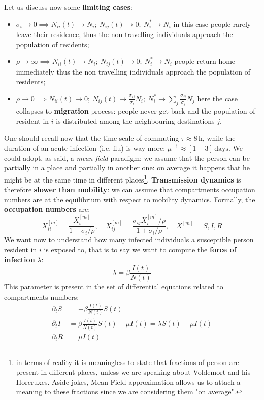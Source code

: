 \documentclass[../main/main.tex]{subfiles}
\begin{document}
Let us discuss now some \textbf{limiting cases}:
\begin{itemize}
    \item $\sigma_i \to 0 \implies N_{ii}(t) \to N_i;\ N_{ij}(t) \to 0;\ N_i^*\to N_i$ in this case people rarely leave their residence, thus the non travelling individuals approach the population of residents;
    \item $\rho \to \infty \implies N_{ii}(t) \to N_i;\ N_{ij}(t) \to 0;\ N_i^*\to N_i$ people return home immediately thus the non travelling individuals approach the population of residents;
    \item $\rho \to 0 \implies N_{ii}(t) \to 0;\ N_{ij}(t) \to \frac{\sigma_{ij}}{\sigma_i}N_i;\ N_i^*\to \sum_j \frac{\sigma_{ji}}{\sigma_j} N_j$ here the case collapses to \textbf{migration} process: people never get back and the population of resident in $i$ is distributed among the neighbouring destinations $j$.
\end{itemize}

One should recall now that the time scale of commuting $\tau \approx 8\,\text{h}$, while the duration of an acute infection (i.e. flu) is way more: $\mu^{-1} \approx [1-3]\, \text{days}$. We could adopt, as said, a \textit{mean field} paradigm: we assume that the person can be partially in a place and partially in another one: on average it happens that he might be at the same time in different places\footnote{in terms of reality it is meaningless to state that fractions of person are present in different places, unless we are speaking about Voldemort and his Horcruxes. Aside jokes, Mean Field approximation allows us to attach a meaning to these fractions since we are considering them "on average".}. \textbf{Transmission dynamics} is therefore \textbf{slower than mobility}: we can assume that compartments occupation numbers are at the equilibrium with respect to mobility dynamics. Formally, the \textbf{occupation numbers} are:
\begin{equation}
    X_{ii}^{[m]} = \frac{X_i^{[m]}}{1+\sigma_i/\rho}, \quad X_{ij}^{[m]} = \frac{\sigma_{ij}X_i^{[m]}/\rho}{1+\sigma_i/\rho}, \quad X^{[m]} = S,I,R
\end{equation}
We want now to understand how many infected individuals a susceptible person resident in $i$ is exposed to, that is to say we want to compute the \textbf{force of infection} $\lambda$:
\begin{equation}
    \lambda = \beta \frac{I(t)}{N(t)}
\end{equation}
This parameter is present in the set of differential equations related to compartments numbers:
\begin{subequations}
\begin{align}
    \partial_t S &= -\beta \frac{I(t)}{N(t)} S(t)\\
    \partial_t I &= \beta \frac{I(t)}{N(t)} S(t) - \mu I (t) = \lambda S(t) - \mu I (t)\\
    \partial_t R &= \mu I(t)
\end{align}
\end{subequations}
\end{document}
